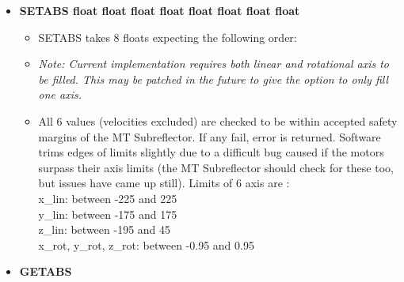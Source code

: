 \documentclass[12pt]{report}
\begin{document}
	\begin{itemize}
	
		\item[] {\bf{SETABS float float float float float float float float}}
			\begin{itemize}
				\item[] {SETABS takes 8 floats expecting the following order:}
				
				\item[]  {\textit{Note: Current implementation requires both linear and rotational axis to be filled. This may be patched in the 
				future to give the option to only fill one axis.}}
				\item[] {All 6 values (velocities excluded) are checked to be within accepted safety margins of the MT Subreflector. If any fail, 
				error is returned. Software trims edges of limits slightly due to a difficult bug caused if the motors surpass their axis limits (the MT Subreflector should check for these too, but issues have came up still). Limits of 6 axis are : \\ 
				x\_lin: between -225 and 225 \\
				y\_lin: between -175 and 175 \\
				z\_lin: between -195 and 45 \\
				x\_rot, \hspace{2px} y\_rot, \hspace{2px} z\_rot: between -0.95 and 0.95}
				
			\end{itemize}
			

		\item[] {\bf{GETABS}}
                        

\end{itemize}
\end{document}
